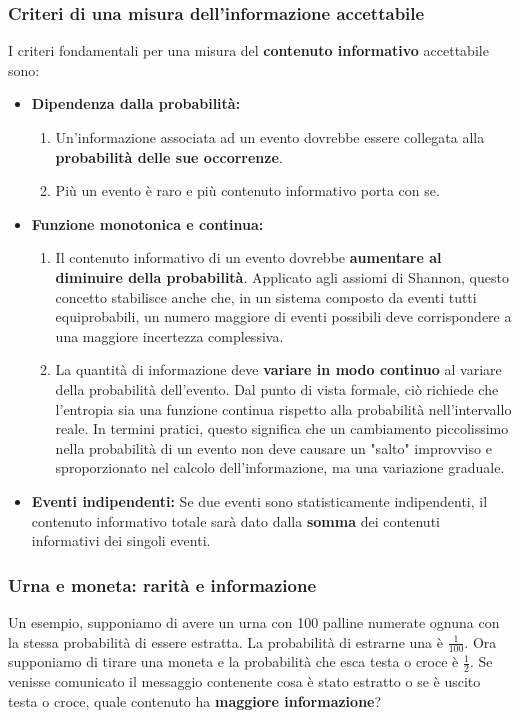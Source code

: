 \documentclass{article}
\theoremstyle{definition}
\numberwithin{equation}{section}
\begin{document}
\subsubsection{Criteri di una misura dell'informazione accettabile}
I criteri fondamentali per una misura del \textbf{contenuto informativo} accettabile sono:
\begin{itemize}
    \item \textbf{Dipendenza dalla probabilità:}
          \begin{enumerate}
              \item Un'informazione associata ad un evento dovrebbe essere collegata alla \textbf{probabilità delle sue occorrenze}.
              \item  Più un evento è raro e più contenuto informativo porta con se.
          \end{enumerate}
    \item \textbf{Funzione monotonica e continua:}
          \begin{enumerate}
              \item Il contenuto informativo di un evento dovrebbe \textbf{aumentare al diminuire della probabilità}. Applicato agli assiomi di Shannon, questo concetto stabilisce anche che, in un sistema composto da eventi tutti equiprobabili, un numero maggiore di eventi possibili deve corrispondere a una maggiore incertezza complessiva.
              \item La quantità di informazione deve \textbf{variare in modo continuo} al variare della probabilità dell'evento. Dal punto di vista formale, ciò richiede che l'entropia sia una funzione continua rispetto alla probabilità nell'intervallo reale. In termini pratici, questo significa che un cambiamento piccolissimo nella probabilità di un evento non deve causare un "salto" improvviso e sproporzionato nel calcolo dell'informazione, ma una variazione graduale.
          \end{enumerate}
    \item \textbf{Eventi indipendenti:} Se due eventi sono statisticamente indipendenti, il contenuto informativo totale sarà dato dalla \textbf{somma} dei contenuti informativi dei singoli eventi.
\end{itemize}

\subsubsection{Urna e moneta: rarità e informazione}
Un esempio, supponiamo di avere un urna con 100 palline numerate ognuna con la stessa probabilità di essere estratta. La probabilità di estrarne una è $\frac{1}{100}$. Ora supponiamo di tirare una moneta e la probabilità che esca testa o croce è $\frac{1}{2}$. Se venisse comunicato il messaggio contenente cosa è stato estratto o se è uscito testa o croce, quale contenuto ha \textbf{maggiore informazione}?
\end{document}
